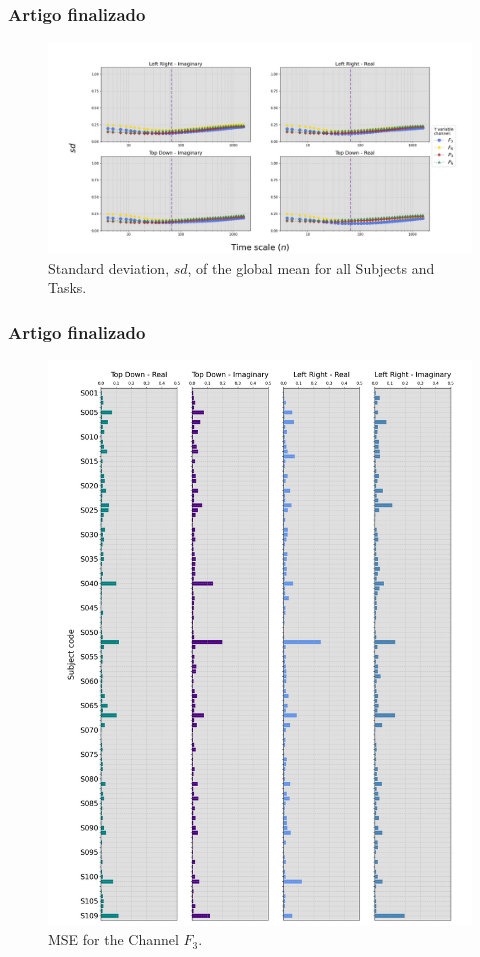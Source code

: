 \documentclass[11pt, aspectratio=169]{beamer}
\begin{document}
\begin{frame}
  \frametitle{Artigo finalizado}

\begin{figure}[!h]
	\includegraphics[height=.5\paperheight]{../Figures/art_02/Fig9.jpg}
	\caption{Standard deviation, $sd$, of the global mean for all Subjects and Tasks.}
	\label{fig09}
\end{figure}
\end{frame}

\begin{frame}
  \frametitle{Artigo finalizado}

\begin{figure}[!h]
	\includegraphics[height=.6\paperheight]{../Figures/art_02/Fig10.jpg}
	\caption{MSE for the Channel $F_{3}$.}
	\label{fig21}
\end{figure}
\end{frame}
\end{document}
